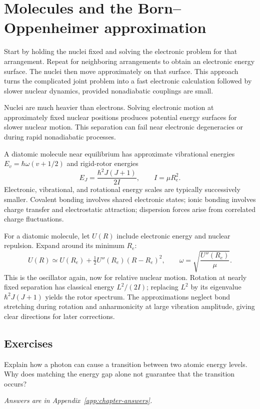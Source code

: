 \documentclass[11pt,oneside]{book}
\theoremstyle{reviewstyle}
\newcommand{\learningcheck}[1]{\subsection*{Exercises}\noindent #1\par\smallskip\noindent\emph{Answers are in Appendix~\ref{app:chapter-answers}.}}
\begin{document}
\section{Molecules and the Born--Oppenheimer approximation}
Start by holding the nuclei fixed and solving the electronic problem for that arrangement. Repeat for neighboring arrangements to obtain an electronic energy surface. The nuclei then move approximately on that surface. This approach turns the complicated joint problem into a fast electronic calculation followed by slower nuclear dynamics, provided nonadiabatic couplings are small.

Nuclei are much heavier than electrons. Solving electronic motion at approximately fixed nuclear positions produces potential energy surfaces for slower nuclear motion. This separation can fail near electronic degeneracies or during rapid nonadiabatic processes.

A diatomic molecule near equilibrium has approximate vibrational energies $E_v=\hbar\omega(v+1/2)$ and rigid-rotor energies
\begin{equation}E_J=\frac{\hbar^2J(J+1)}{2I},\qquad I=\mu R_e^2.\end{equation}
Electronic, vibrational, and rotational energy scales are typically successively smaller. Covalent bonding involves shared electronic states; ionic bonding involves charge transfer and electrostatic attraction; dispersion forces arise from correlated charge fluctuations.

For a diatomic molecule, let $U(R)$ include electronic energy and nuclear repulsion. Expand around its minimum $R_e$:
\begin{equation}
U(R)\simeq U(R_e)+\tfrac12U''(R_e)(R-R_e)^2,
\qquad \omega=\sqrt{\frac{U''(R_e)}\mu}.
\end{equation}
This is the oscillator again, now for relative nuclear motion. Rotation at nearly fixed separation has classical energy $L^2/(2I)$; replacing $L^2$ by its eigenvalue $\hbar^2J(J+1)$ yields the rotor spectrum. The approximations neglect bond stretching during rotation and anharmonicity at large vibration amplitude, giving clear directions for later corrections.

\learningcheck{Explain how a photon can cause a transition between two atomic energy levels. Why does matching the energy gap alone not guarantee that the transition occurs?}
\end{document}
